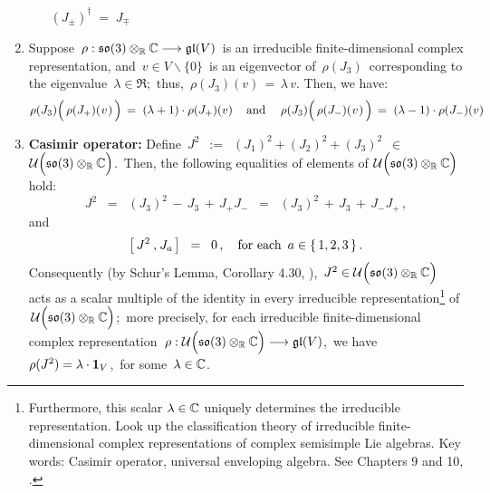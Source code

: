 \begin{proposition}
\begin{enumerate}
\begin{enumerate}
		$(J_{\pm})^{\dagger} \; = \; J_{\mp}$
	\end{enumerate}
\item
	Suppose
	\,$\rho : \mathfrak{so}(3) \otimes_{\mathbb{R}} \mathbb{C} \longrightarrow \mathfrak{gl}(V)$\,
	is an irreducible finite-dimensional complex representation, and
	\,$v \in V \backslash\{0\}$\, is an eigenvector of \,$\rho(J_{3})$\,
	corresponding to the eigenvalue \,$\lambda \in \Re$;\, thus, \,$\rho(J_{3})(v) \,=\, \lambda\,v$.
	Then, we have:
	\begin{equation*}
	\rho(J_{3})\!\left(\,\rho(J_{+})(\overset{{\color{white}-}}{v})\,\right) \, = \; (\lambda+1)\cdot\rho(J_{+})(v)\,
	\quad\textnormal{and}\quad\;
	\rho(J_{3})\!\left(\,\rho(J_{-})(\overset{{\color{white}-}}{v})\,\right) \, = \; (\lambda-1)\cdot\rho(J_{-})(v)
	\end{equation*}
\item
	\textbf{Casimir operator:}\;\;
	Define
	\,$J^{2}$
	\,$:=$\,
	$(J_{1})^{2} + (J_{2})^{2} + (J_{3})^{2}$
	\,$\in$\
	 $\mathcal{U}\!\left(\mathfrak{so}(3) \overset{{\color{white}.}}{\otimes_{\Re}} \C\right)$.\,
	Then, the following equalities of elements of
	\;$\mathcal{U}\!\left(\mathfrak{so}(3) \overset{{\color{white}.}}{\otimes_{\Re}} \C\right)$
	hold:
	\begin{equation*}
	J^{2}
	\;\; =\;\;
		(J_{3})^{2} \,-\, J_{3} \,+\, J_{+}J_{-}
	\;\; =\;\;
		(J_{3})^{2} \,+\, J_{3} \,+\, J_{-}J_{+}\,,
	\end{equation*}
	and
	\begin{equation*}
	\left[\,J^{2}\,\overset{{\color{white}1}}{,}\,J_{a}\,\right]
	\;\; = \;\;
		0\,,
	\quad
	\textnormal{for each \,$a \in \{\,1,2,3\,\}$}\,.
	\end{equation*}
	Consequently (by Schur's Lemma, Corollary 4.30, \cite{Hall2015}), 
	\,$J^{2} \in \mathcal{U}\!\left(\mathfrak{so}(3) \overset{{\color{white}.}}{\otimes_{\Re}} \C\right)$\,
	acts as a scalar multiple of the identity in every irreducible
	representation\footnote{Furthermore, this scalar $\lambda \in \mathbb{C}$ uniquely determines
	the irreducible representation.
	Look up the classification theory of irreducible finite-dimensional complex representations
	of complex semisimple Lie algebras.
	Key words: Casimir operator, universal enveloping algebra. See Chapters 9 and 10, \cite{Hall2015}.}
	of \,$\mathcal{U}\!\left(\mathfrak{so}(3) \overset{{\color{white}.}}{\otimes_{\Re}} \C\right)$;\,
	more precisely, for each irreducible finite-dimensional complex representation
	\,$\rho : \mathcal{U}\!\left(\mathfrak{so}(3) \overset{{\color{white}.}}{\otimes_{\Re}} \C\right) \longrightarrow \mathfrak{gl}(V)$,\,
	we have \,$\rho(J^{2}) = \lambda \cdot \textnormal{\textbf{1}}_{V}$,\,
	for some \,$\lambda \in \mathbb{C}$.
\end{enumerate}
\end{proposition}

